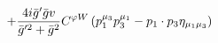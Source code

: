 %
\begin{dmath*}
%
  +  \frac{4 i {\bar g}^\prime {\bar g}{} v}{{\bar g}^{\prime 2} + {\bar g}{}^2}C^{ \varphi  W} \left(p_1^{\mu_3} p_3^{\mu_1} - p_{1}\nobreak\cdot\nobreak{}p_{3} \eta_{\mu_1 \mu_3}\right)
%
\end{dmath*}
%
